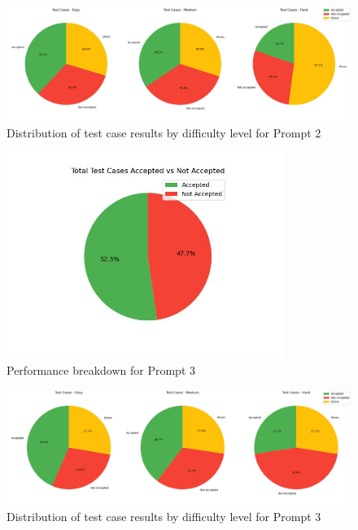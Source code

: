 \begin{figure}[H]
    \centering
    \includegraphics[width=1\textwidth]{figures/2/pie_difficulty.jpg}
    \caption{Distribution of test case results by difficulty level for Prompt 2}
    \label{fig:prompt2_difficulty}
\end{figure}

\begin{figure}[H]
    \centering
    \includegraphics[width=0.8\textwidth]{figures/3/total_accepted_not.jpg}
    \caption{Performance breakdown for Prompt 3}
    \label{fig:prompt3_performance}
\end{figure}

\begin{figure}[H]
    \centering
    \includegraphics[width=1\textwidth]{figures/3/pie_difficulty.jpg}
    \caption{Distribution of test case results by difficulty level for Prompt 3}
    \label{fig:prompt3_difficulty}
\end{figure}

